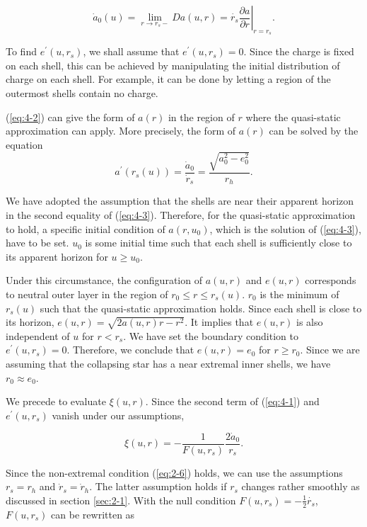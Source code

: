 \documentclass[letterpaper,12pt]{article}
\begin{document}
\begin{equation}\label{eq:4-2}
\dot a_{0}(u) = \lim_{r \to r_{s}-} Da(u,r) = \dot{r_{s}} \left.\frac{\partial a}{\partial r}\right|_{r=r_{s}}.
\end{equation}


To find $e^{\prime}(u, r_{s})$, we shall assume that $e^{\prime}(u, r_{s}) = 0$. Since the charge is fixed on each shell, this can be achieved by manipulating the initial distribution of charge on each shell. For example, it can be done by letting a region of the outermost shells contain no charge. 

(\ref{eq:4-2}) can give the form of $a(r)$ in the region of $r$ where the quasi-static approximation can apply. More precisely, the form of $a(r)$ can be solved by the equation
\begin{equation} \label{eq:4-3}
a^{\prime}(r_{s}(u)) = \frac{\dot{a}_{0}}{\dot{r}_{s}} = \frac{\sqrt{a_{0}^{2}-e_{0}^{2}}}{r_{h}}.
\end{equation}

We have adopted the assumption that the shells are near their apparent horizon in the second equality of (\ref{eq:4-3}). 
Therefore, for the quasi-static approximation to hold, a specific initial condition of $a(r, u_{0})$, which is the solution of (\ref{eq:4-3}), have to be set. $u_{0}$ is some initial time such that each shell is sufficiently close to its apparent horizon for $u \geq u_{0}$. 

Under this circumstance, the configuration of $a(u, r)$ and $e(u, r)$ corresponds to neutral outer layer in the region of $r_{0} \leq r \leq r_{s}(u)$. $r_{0}$ is the minimum of $r_{s}(u)$ such that the quasi-static approximation holds.  Since each shell is close to its horizon, $e(u, r)= \sqrt{2a(u, r)r-r^{2}}$. It implies that $e(u, r)$ is also independent of $u$  for $r < r_{s}$. We have set the boundary condition to $e^{\prime}(u, r_{s}) = 0$.  Therefore, we conclude that $e(u, r) = e_{0}$ for $r \geq r_{0}$. Since we are assuming that the collapsing star has a near extremal inner shells, we have $r_{0} \approx e_{0}$.


We precede to evaluate $\xi(u,r)$. Since the second term of (\ref{eq:4-1}) and $e^{\prime}(u, r_{s})$ vanish under our assumptions,

\begin{equation}
\xi(u, r)  = -\frac{1}{F(u,r_{s})}\frac{2\dot a_{0}}{r_{s}}.
\end{equation}

Since the non-extremal condition (\ref{eq:2-6}) holds, we can use the assumptions  $r_{s} = r_{h}$ and $\dot{r}_{s} = \dot{r}_{h}$. The latter assumption holds if $r_{s}$ changes rather smoothly as discussed in section \ref{sec:2-1}. With the null condition $F(u, r_{s}) = -\frac{1}{2}\dot{r_{s}}$, $F(u, r_{s})$ can be rewritten as 
\end{document}
